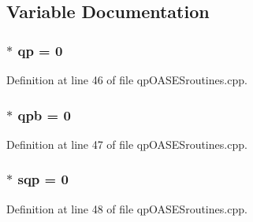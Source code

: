 \subsection{Variable Documentation}
\subsubsection[{qp}]{$\ast$ {\bf qp} = 0}\label{qpOASESroutines_8cpp_aceda8d7523613f0f0913e593aeade348}


Definition at line 46 of file qpOASESroutines.cpp.

\subsubsection[{qpb}]{$\ast$ {\bf qpb} = 0}\label{qpOASESroutines_8cpp_a7e6083d7d0a8de265e081e409fc5dd99}


Definition at line 47 of file qpOASESroutines.cpp.

\subsubsection[{sqp}]{$\ast$ {\bf sqp} = 0}\label{qpOASESroutines_8cpp_a2a2d53ce4d00d40238f21d60cced514b}


Definition at line 48 of file qpOASESroutines.cpp.

